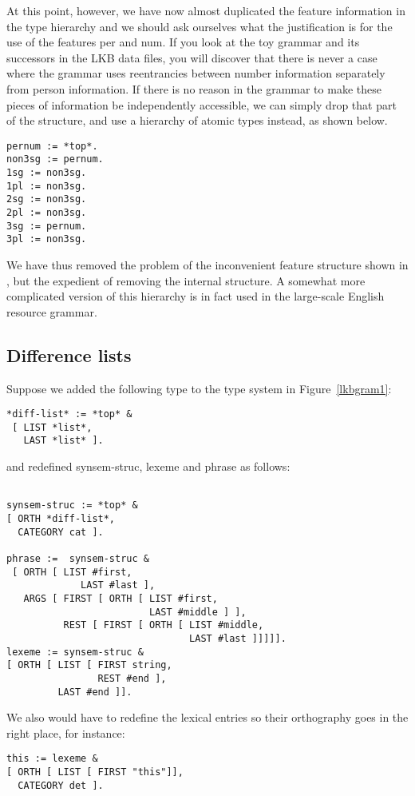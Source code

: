\documentclass[12pt]{report}
\begin{document}
At this point, however, we have now almost duplicated the feature information 
in the type hierarchy and
we should ask ourselves what the justification is for
the use of the features {\feature per} and {\feature num}.  
If you look at the toy grammar and
its successors in the LKB data files, you will discover that there
is never a case where the grammar uses reentrancies between
number information
separately from person information.
If there is no reason in the grammar
to make these pieces of information be independently
accessible, we can simply drop that part of the structure, and use a hierarchy
of atomic types instead, as shown below.
\begin{verbatim}
pernum := *top*.
non3sg := pernum.
1sg := non3sg.
1pl := non3sg.
2sg := non3sg.
2pl := non3sg.
3sg := pernum.
3pl := non3sg.
\end{verbatim}
We have thus removed the problem of the inconvenient
feature structure shown in , but the expedient
of removing the internal structure.
A somewhat more complicated version of this hierarchy is in fact
used in the large-scale
English resource grammar.  

\subsection{Difference lists}

Suppose we added the following type to 
the type system in Figure~\ref{lkbgram1}:
\begin{verbatim}
*diff-list* := *top* &
 [ LIST *list*,
   LAST *list* ].
\end{verbatim}
and redefined {\type synsem-struc}, {\type lexeme} and
{\type phrase} as follows:
\begin{verbatim}

synsem-struc := *top* &
[ ORTH *diff-list*,
  CATEGORY cat ].

phrase :=  synsem-struc &
 [ ORTH [ LIST #first,
	         LAST #last ],
   ARGS [ FIRST [ ORTH [ LIST #first,
                         LAST #middle ] ], 
          REST [ FIRST [ ORTH [ LIST #middle,
                                LAST #last ]]]]].
lexeme := synsem-struc &
[ ORTH [ LIST [ FIRST string,
                REST #end ],
         LAST #end ]].

\end{verbatim}
We also would have to
redefine the lexical entries so their orthography
goes in the right place, for instance: 
\begin{verbatim}
this := lexeme &
[ ORTH [ LIST [ FIRST "this"]],
  CATEGORY det ].
\end{verbatim}
\end{document}
